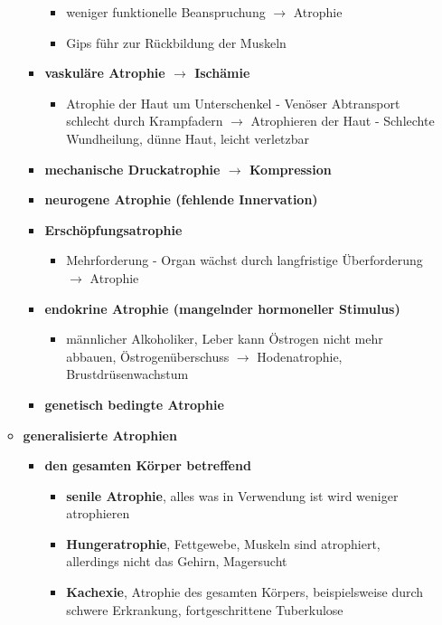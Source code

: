 \begin{itemize}
\begin{itemize}
\begin{itemize}
							\begin{itemize}
								\item weniger funktionelle Beanspruchung $\rightarrow$ Atrophie
								\item Gips führ zur Rückbildung der Muskeln
							\end{itemize}
						\item \textbf{vaskuläre Atrophie $\rightarrow$ Ischämie}
							\begin{itemize}
								\item Atrophie der Haut um Unterschenkel - Venöser Abtransport schlecht durch Krampfadern $\rightarrow$ Atrophieren der Haut - Schlechte Wundheilung, dünne Haut, leicht verletzbar
							\end{itemize}
						\item \textbf{mechanische Druckatrophie $\rightarrow$ Kompression}
						\item \textbf{neurogene Atrophie (fehlende Innervation)}
						\item \textbf{Erschöpfungsatrophie}
							\begin{itemize}
								\item Mehrforderung - Organ wächst durch langfristige Überforderung $\rightarrow$ Atrophie
							\end{itemize}
						\item \textbf{endokrine Atrophie (mangelnder hormoneller Stimulus)}
							\begin{itemize}
								\item männlicher Alkoholiker, Leber kann Östrogen nicht mehr abbauen, Östrogenüberschuss $\rightarrow$ Hodenatrophie, Brustdrüsenwachstum
							\end{itemize}
						\item \textbf{genetisch bedingte Atrophie}
					\end{itemize}
				\item \textbf{generalisierte Atrophien}
					\begin{itemize}
						\item \textbf{den gesamten Körper betreffend}
							\begin{itemize}
								\item \textbf{senile Atrophie}, alles was in Verwendung ist wird weniger atrophieren
								\item \textbf{Hungeratrophie}, Fettgewebe, Muskeln sind atrophiert, allerdings nicht das Gehirn, Magersucht
								\item \textbf{Kachexie}, Atrophie des gesamten Körpers, beispielsweise durch schwere Erkrankung, fortgeschrittene Tuberkulose

\end{itemize}
\end{itemize}
\end{itemize}
\end{itemize}
